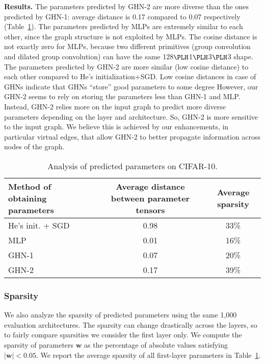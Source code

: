 \textbf{Results.} The parameters predicted by GHN-2 are more diverse than the ones predicted by GHN-1: average distance is 0.17 compared to 0.07 respectively (Table~\ref{tab:sensitivity_sparsity}). The parameters predicted by MLPs are extremely similar to each other, since the graph structure is not exploited by MLPs. The cosine distance is not exactly zero for MLPs, because two different primitives (group convolution and dilated group convolution) can have the same 128$\PLH$1$\PLH$3$\PLH$3 shape. The parameters predicted by GHN-2 are more similar (low cosine distance) to each other compared to He’s initialization+SGD. Low cosine distances in case of GHNs indicate that GHNs ``store'' good parameters to some degree However, our GHN-2 seems to rely on storing the parameters less than GHN-1 and MLP. Instead, GHN-2 relies more on the input graph to predict more diverse parameters depending on the layer and architecture. So, GHN-2 is more sensitive to the input graph. We believe this is achieved by our enhancements, in particular virtual edges, that allow GHN-2 to better propagate information across nodes of the graph.

\begin{table}[tbhp]
	\caption{Analysis of predicted parameters on CIFAR-10.}
	\label{tab:sensitivity_sparsity}
	\vspace{3pt}
	\small
	\centering
	\begin{tabular}{lcc}
		\toprule
		\textbf{Method of obtaining parameters} & \textbf{Average distance between parameter tensors} &	\textbf{Average sparsity} \\
		\midrule
		He’s init. + SGD &	0.98 & 33\% \\
		MLP	& 0.01	& 16\%\Tstrut\\
		GHN-1 & 0.07 & 20\% \\
		GHN-2 &	0.17 & 39\% \\
		\bottomrule
	\end{tabular}
\end{table}

\subsubsection{Sparsity}

We also analyze the sparsity of predicted parameters using the same 1,000 evaluation architectures. The sparsity can change drastically across the layers, so to fairly compare sparsities we consider the first layer only. We compute the sparsity of parameters $\mathbf{w}$ as the percentage of absolute values satisfying $|\mathbf{w}| < 0.05$. We report the average sparsity of all first-layer parameters in Table~\ref{tab:sensitivity_sparsity}.


